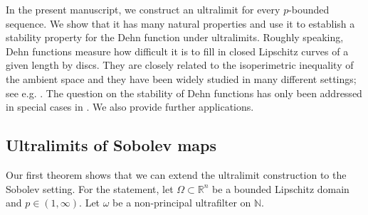 \documentclass[a4paper,leqno]{amsart}
\numberwithin{equation}{section}
\theoremstyle{remark}
\theoremstyle{remark}
\newcommand{\N}{\mathbb{N}}
\newcommand{\R}{\mathbb{R}}
\begin{document}
In the present manuscript, we construct an ultralimit for every $p$-bounded sequence. We show that it has many natural properties and use it to establish a stability property for the Dehn function under ultralimits. Roughly speaking, Dehn functions measure how difficult it is to fill in closed Lipschitz curves of a given length by discs. They are closely related to the isoperimetric inequality of the ambient space and they have been widely studied in many different settings; see e.g. \cite{reshetnyak-1968-non-expansive-maps-in-a-space-of-curvature-no-greater-than-K,gromov-1993-asymptotic-invariants-of-infinite-groups,gersten-holt-riley-2003-isoperimetric-inequalities-for-nilpotent-groups,young-2013-the-dehn-function-of-slnz,Lyt:Wen:18:CAT,stadler-the-structure-of-minimal-surfaces-in-cat-0-spaces,stadler-wenger-2025-isoperimetric-inequalities-vs-upper-curvature-bounds}. %
The question on the stability of Dehn functions has only been addressed in special cases in \cite{wenger-2011-nilpotent-groups-without-exactly-polynomial-dehn-function,Wen:2019,Lyt:Wen:You:20,stadler-wenger-2025-isoperimetric-inequalities-vs-upper-curvature-bounds}. We also provide further applications.

\subsection{Ultralimits of Sobolev maps}
Our first theorem shows that we can extend the ultralimit construction to the Sobolev setting. For the statement, let $\Omega\subset\R^n$ be a bounded Lipschitz domain and $p \in (1,\infty)$. Let $\omega$ be a non-principal ultrafilter on $\N$.
\end{document}
